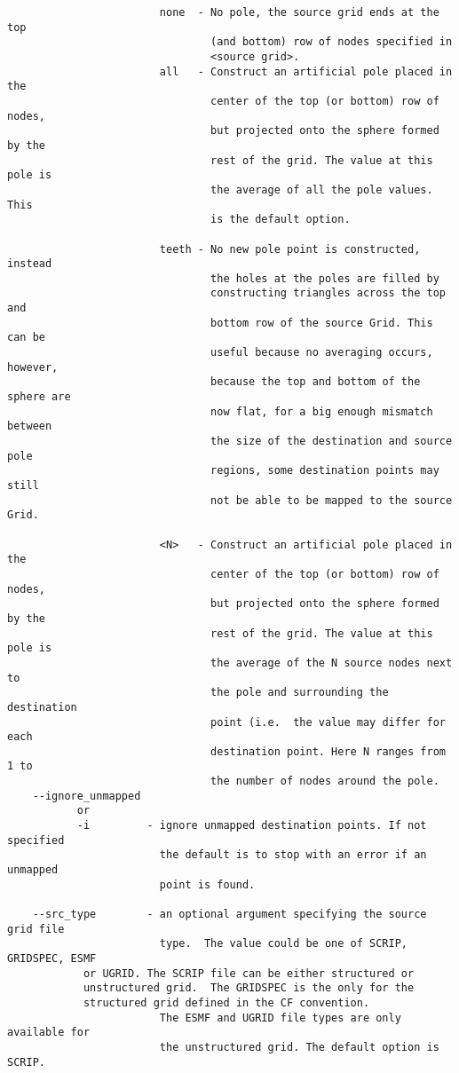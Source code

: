 \begin{verbatim}
                        none  - No pole, the source grid ends at the top 
                                (and bottom) row of nodes specified in 
                                <source grid>.
                        all   - Construct an artificial pole placed in the 
                                center of the top (or bottom) row of nodes, 
                                but projected onto the sphere formed by the 
                                rest of the grid. The value at this pole is 
                                the average of all the pole values. This
                                is the default option.

                        teeth - No new pole point is constructed, instead 
                                the holes at the poles are filled by 
                                constructing triangles across the top and 
                                bottom row of the source Grid. This can be 
                                useful because no averaging occurs, however, 
                                because the top and bottom of the sphere are 
                                now flat, for a big enough mismatch between 
                                the size of the destination and source pole 
                                regions, some destination points may still 
                                not be able to be mapped to the source Grid. 

                        <N>   - Construct an artificial pole placed in the 
                                center of the top (or bottom) row of nodes, 
                                but projected onto the sphere formed by the 
                                rest of the grid. The value at this pole is 
                                the average of the N source nodes next to
                                the pole and surrounding the destination 
                                point (i.e.  the value may differ for each 
                                destination point. Here N ranges from 1 to 
                                the number of nodes around the pole. 
    --ignore_unmapped
           or 
           -i         - ignore unmapped destination points. If not specified
                        the default is to stop with an error if an unmapped
                        point is found. 

    --src_type        - an optional argument specifying the source grid file 
                        type.  The value could be one of SCRIP, GRIDSPEC, ESMF 
			or UGRID. The SCRIP file can be either structured or
 			unstructured grid.  The GRIDSPEC is the only for the
			structured grid defined in the CF convention. 
                        The ESMF and UGRID file types are only available for 
                        the unstructured grid. The default option is SCRIP.


\end{verbatim}
